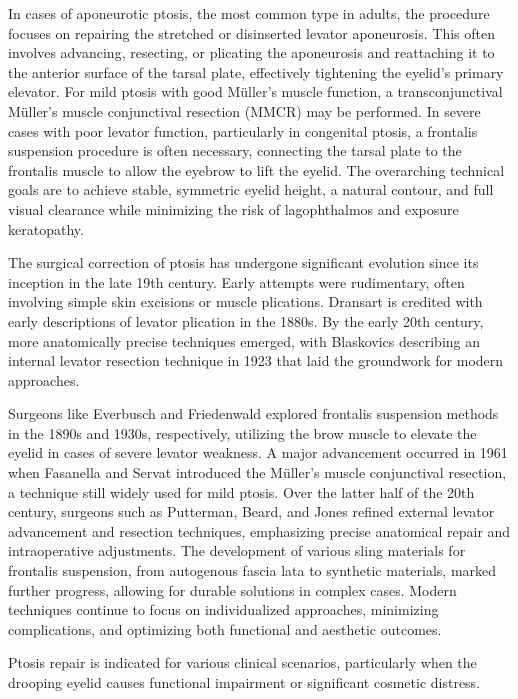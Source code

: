 In cases of aponeurotic ptosis, the most common type in adults, the procedure focuses on repairing the stretched or disinserted levator aponeurosis. This often involves advancing, resecting, or plicating the aponeurosis and reattaching it to the anterior surface of the tarsal plate, effectively tightening the eyelid's primary elevator. For mild ptosis with good M\"uller's muscle function, a transconjunctival M\"uller's muscle conjunctival resection (MMCR) may be performed. In severe cases with poor levator function, particularly in congenital ptosis, a frontalis suspension procedure is often necessary, connecting the tarsal plate to the frontalis muscle to allow the eyebrow to lift the eyelid. The overarching technical goals are to achieve stable, symmetric eyelid height, a natural contour, and full visual clearance while minimizing the risk of lagophthalmos and exposure keratopathy.

The surgical correction of ptosis has undergone significant evolution since its inception in the late 19th century. Early attempts were rudimentary, often involving simple skin excisions or muscle plications. Dransart is credited with early descriptions of levator plication in the 1880s. By the early 20th century, more anatomically precise techniques emerged, with Blaskovics describing an internal levator resection technique in 1923 that laid the groundwork for modern approaches.

Surgeons like Everbusch and Friedenwald explored frontalis suspension methods in the 1890s and 1930s, respectively, utilizing the brow muscle to elevate the eyelid in cases of severe levator weakness. A major advancement occurred in 1961 when Fasanella and Servat introduced the M\"uller's muscle conjunctival resection, a technique still widely used for mild ptosis. Over the latter half of the 20th century, surgeons such as Putterman, Beard, and Jones refined external levator advancement and resection techniques, emphasizing precise anatomical repair and intraoperative adjustments. The development of various sling materials for frontalis suspension, from autogenous fascia lata to synthetic materials, marked further progress, allowing for durable solutions in complex cases. Modern techniques continue to focus on individualized approaches, minimizing complications, and optimizing both functional and aesthetic outcomes.

Ptosis repair is indicated for various clinical scenarios, particularly when the drooping eyelid causes functional impairment or significant cosmetic distress.

